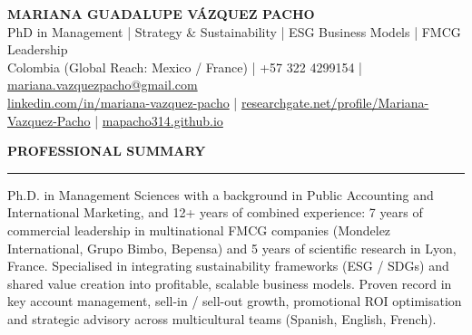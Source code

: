 \documentclass[10pt,a4paper]{article}
\newcommand{\cvsection}[1]{%
  \vspace{0.6em}%
  {\large\bfseries #1}\par
  \vspace{-0.45em}%
  \rule{\textwidth}{0.6pt}\par
  \vspace{0.25em}%
}
\begin{document}
\begin{center}
  {\LARGE\bfseries MARIANA GUADALUPE V\'AZQUEZ PACHO}\\[0.4em]
  {\large PhD in Management | Strategy \& Sustainability | ESG Business Models | FMCG Leadership}\\[0.5em]
  {\small Colombia (Global Reach: Mexico / France) | +57 322 4299154 | \href{mailto:mariana.vazquezpacho@gmail.com}{mariana.vazquezpacho@gmail.com}}\\[0.15em]
  {\small \href{https://www.linkedin.com/in/mariana-vazquez-pacho}{linkedin.com/in/mariana-vazquez-pacho} | \href{https://www.researchgate.net/profile/Mariana-Vazquez-Pacho}{researchgate.net/profile/Mariana-Vazquez-Pacho} | \href{https://mapacho314.github.io}{mapacho314.github.io}}
\end{center}

\cvsection{PROFESSIONAL SUMMARY}
Ph.D. in Management Sciences with a background in Public Accounting and International Marketing, and 12+ years of combined experience: 7 years of commercial leadership in multinational FMCG companies (Mondelez International, Grupo Bimbo, Bepensa) and 5 years of scientific research in Lyon, France. Specialised in integrating sustainability frameworks (ESG / SDGs) and shared value creation into profitable, scalable business models. Proven record in key account management, sell-in / sell-out growth, promotional ROI optimisation and strategic advisory across multicultural teams (Spanish, English, French).
\end{document}
